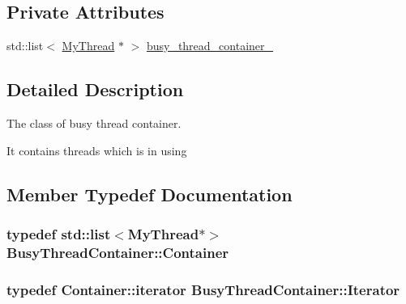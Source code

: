 \subsection*{Private Attributes}
\begin{DoxyCompactItemize}
\item 
std\+::list$<$ \hyperlink{classMyThread}{My\+Thread} $\ast$ $>$ \hyperlink{classBusyThreadContainer_a8dc554b281ea8fdd9faf24166de0d4d3}{busy\+\_\+thread\+\_\+container\+\_\+}
\end{DoxyCompactItemize}


\subsection{Detailed Description}
The class of busy thread container. 

It contains threads which is in using 

\subsection{Member Typedef Documentation}
\subsubsection[{\texorpdfstring{Container}{Container}}]{\setlength{\rightskip}{0pt plus 5cm}typedef std\+::list$<${\bf My\+Thread}$\ast$$>$ {\bf Busy\+Thread\+Container\+::\+Container}\hspace{0.3cm}{\ttfamily [private]}}\hypertarget{classBusyThreadContainer_ab3e046394f1969fb1f43ea358c1c6950}{}\label{classBusyThreadContainer_ab3e046394f1969fb1f43ea358c1c6950}
\subsubsection[{\texorpdfstring{Iterator}{Iterator}}]{\setlength{\rightskip}{0pt plus 5cm}typedef Container\+::iterator {\bf Busy\+Thread\+Container\+::\+Iterator}\hspace{0.3cm}{\ttfamily [private]}}\hypertarget{classBusyThreadContainer_acc7f249156d5ed707acefe652f07fb18}{}\label{classBusyThreadContainer_acc7f249156d5ed707acefe652f07fb18}


